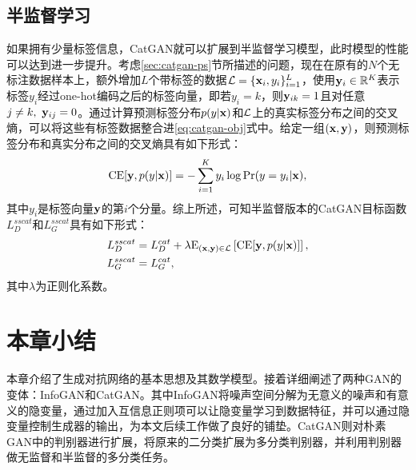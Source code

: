 \subsection{半监督学习}\label{sec:ss-catgan}
如果拥有少量标签信息，CatGAN就可以扩展到半监督学习模型，此时模型的性能可以达到进一步提升。考虑\ref{sec:catgan-ps}节所描述的问题，现在在原有的$N$个无标注数据样本上，额外增加$L$个带标签的数据$\mathcal{L} = \{\mathbf{x}_i, y_i\}_{i=1}^L$，使用$\mathbf{y}_i \in \mathbb{R}^K$表示标签$y_i$经过one-hot编码之后的标签向量，即若$y_i = k$，则$\mathbf{y}_{ik} = 1$且对任意$j \neq k,~\mathbf{y}_{ij} = 0$。通过计算预测标签分布$p(y|\mathbf{x})$和$\mathcal{L}$上的真实标签分布之间的交叉熵，可以将这些有标签数据整合进\eqref{eq:catgan-obj}式中。给定一组$(\mathbf{x}, \mathbf{y})$，则预测标签分布和真实分布之间的交叉熵具有如下形式：
\begin{equation}
  \text{CE}[\mathbf{y}, p(y|\mathbf{x})] = -\sum_{i=1}^K y_i \log\Pr(y=y_i|\mathbf{x}),
  \label{eq:cross-ent}
\end{equation}
其中$y_i$是标签向量$\mathbf{y}$的第$i$个分量。综上所述，可知半监督版本的CatGAN目标函数$L_D^{sscat}$和$L_G^{sscat}$具有如下形式：
\begin{equation}
  \begin{split}
    L_D^{sscat} &= L_D^{cat} + \lambda\text{E}_{(\mathbf{x},\mathbf{y}) \in \mathcal{L}}
    \left[ \text{CE}[\mathbf{y}, p(y|\mathbf{x})] \right], \\
    L_G^{sscat} &= L_G^{cat}, 
  \end{split}
  \label{eq:ss-catgan-obj}
\end{equation}
其中$\lambda$为正则化系数。

\section{本章小结}
本章介绍了生成对抗网络的基本思想及其数学模型。接着详细阐述了两种GAN的变体：InfoGAN和CatGAN。其中InfoGAN将噪声空间分解为无意义的噪声和有意义的隐变量，通过加入互信息正则项可以让隐变量学习到数据特征，并可以通过隐变量控制生成器的输出，为本文后续工作做了良好的铺垫。CatGAN则对朴素GAN中的判别器进行扩展，将原来的二分类扩展为多分类判别器，并利用判别器做无监督和半监督的多分类任务。


